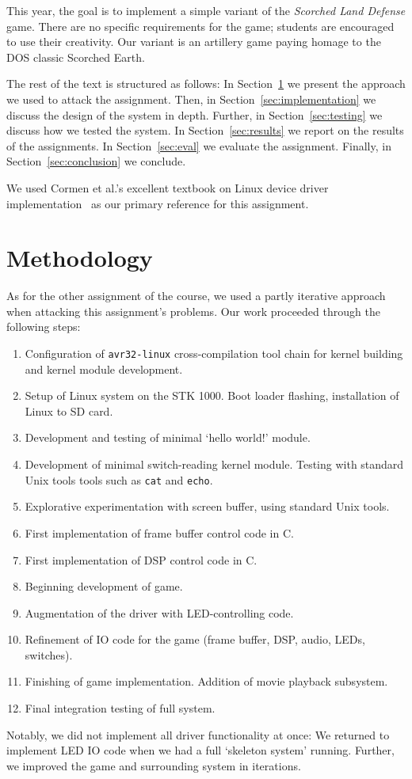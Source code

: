 \documentclass[a4paper,10pt]{article}
\begin{document}
This year, the goal is to implement a simple variant of the \emph{Scorched
Land Defense} game. There are no specific requirements for the game; students
are encouraged to use their creativity. Our variant is an artillery game
paying homage to the DOS classic Scorched Earth. 

The rest of the text is structured as follows: In Section~\ref{sec:method} we
present the approach we used to attack the assignment. Then, in
Section~\ref{sec:implementation} we discuss the design of the system in depth.
Further, in Section~\ref{sec:testing} we discuss how we tested the system. In
Section~\ref{sec:results} we report on the results of the assignments.  In
Section~\ref{sec:eval} we evaluate the assignment. Finally, in
Section~\ref{sec:conclusion} we conclude.

We used Cormen et al.'s excellent textbook on Linux device driver
implementation~\cite{devicedrivers} as our primary reference for this
assignment.

\section{Methodology}
\label{sec:method}
As for the other assignment of the course, we used a partly iterative approach
when attacking this assignment's problems.  Our work proceeded through the
following steps:
\begin{enumerate}
  \footnotesize
  \item Configuration of \texttt{avr32-linux} cross-compilation tool chain 
      for kernel building and kernel module development.
  \item Setup of Linux system on the STK 1000. Boot loader flashing,
      installation of Linux to SD card. 
  \item Development and testing of minimal `hello world!' module.
  \item Development of minimal switch-reading kernel module. Testing with
      standard Unix tools tools such as \texttt{cat} and \texttt{echo}.
  \item Explorative experimentation with screen buffer, using standard Unix
      tools.
  \item First implementation of frame buffer control code in C.
  \item First implementation of DSP control code in C.
  \item Beginning development of game.
  \item Augmentation of the driver with LED-controlling code.
  \item Refinement of IO code for the game (frame buffer, DSP, audio, LEDs,
      switches).
  \item Finishing of game implementation. Addition of movie playback
      subsystem.
  \item Final integration testing of full system.
\end{enumerate}
Notably, we did not implement all driver functionality at once: We returned to
implement LED IO code when we had a full `skeleton system' running. Further,
we improved the game and surrounding system in iterations.
\end{document}
